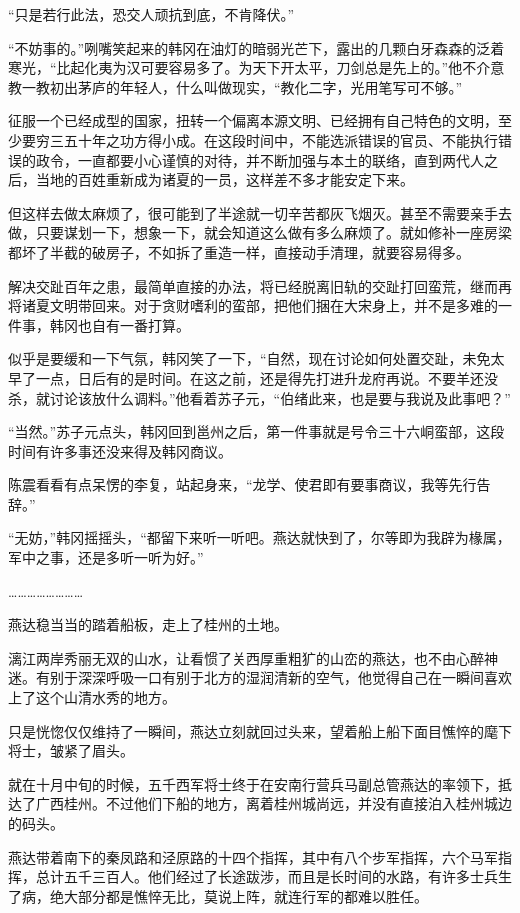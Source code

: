 “只是若行此法，恐交人顽抗到底，不肯降伏。”

“不妨事的。”咧嘴笑起来的韩冈在油灯的暗弱光芒下，露出的几颗白牙森森的泛着寒光，“比起化夷为汉可要容易多了。为天下开太平，刀剑总是先上的。”他不介意教一教初出茅庐的年轻人，什么叫做现实，“教化二字，光用笔写可不够。”

征服一个已经成型的国家，扭转一个偏离本源文明、已经拥有自己特色的文明，至少要穷三五十年之功方得小成。在这段时间中，不能选派错误的官员、不能执行错误的政令，一直都要小心谨慎的对待，并不断加强与本土的联络，直到两代人之后，当地的百姓重新成为诸夏的一员，这样差不多才能安定下来。

但这样去做太麻烦了，很可能到了半途就一切辛苦都灰飞烟灭。甚至不需要亲手去做，只要谋划一下，想象一下，就会知道这么做有多么麻烦了。就如修补一座房梁都坏了半截的破房子，不如拆了重造一样，直接动手清理，就要容易得多。

解决交趾百年之患，最简单直接的办法，将已经脱离旧轨的交趾打回蛮荒，继而再将诸夏文明带回来。对于贪财嗜利的蛮部，把他们捆在大宋身上，并不是多难的一件事，韩冈也自有一番打算。

似乎是要缓和一下气氛，韩冈笑了一下，“自然，现在讨论如何处置交趾，未免太早了一点，日后有的是时间。在这之前，还是得先打进升龙府再说。不要羊还没杀，就讨论该放什么调料。”他看着苏子元，“伯绪此来，也是要与我说及此事吧？”

“当然。”苏子元点头，韩冈回到邕州之后，第一件事就是号令三十六峒蛮部，这段时间有许多事还没来得及韩冈商议。

陈震看看有点呆愣的李复，站起身来，“龙学、使君即有要事商议，我等先行告辞。”

“无妨，”韩冈摇摇头，“都留下来听一听吧。燕达就快到了，尔等即为我辟为椽属，军中之事，还是多听一听为好。”

……………………

燕达稳当当的踏着船板，走上了桂州的土地。

漓江两岸秀丽无双的山水，让看惯了关西厚重粗犷的山峦的燕达，也不由心醉神迷。有别于深深呼吸一口有别于北方的湿润清新的空气，他觉得自己在一瞬间喜欢上了这个山清水秀的地方。

只是恍惚仅仅维持了一瞬间，燕达立刻就回过头来，望着船上船下面目憔悴的麾下将士，皱紧了眉头。

就在十月中旬的时候，五千西军将士终于在安南行营兵马副总管燕达的率领下，抵达了广西桂州。不过他们下船的地方，离着桂州城尚远，并没有直接泊入桂州城边的码头。

燕达带着南下的秦凤路和泾原路的十四个指挥，其中有八个步军指挥，六个马军指挥，总计五千三百人。他们经过了长途跋涉，而且是长时间的水路，有许多士兵生了病，绝大部分都是憔悴无比，莫说上阵，就连行军的都难以胜任。

